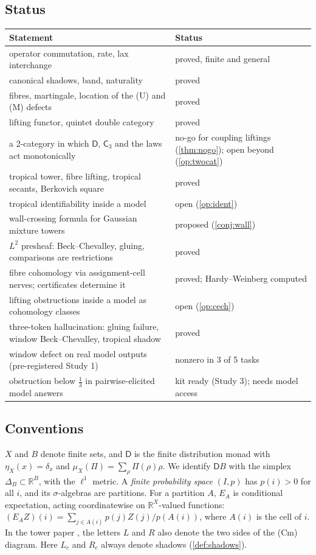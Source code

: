 \documentclass[11pt]{article}
\theoremstyle{definition}
\newcommand{\D}{\mathsf D}
\newcommand{\C}{\mathsf C}
\newcommand{\R}{\mathbb R}
\begin{document}
\subsection{Status}
\begin{center}\small
\begin{tabular}{>{\raggedright}p{9cm}>{\raggedright\arraybackslash}p{5.2cm}}\toprule
Statement & Status\\\midrule
operator commutation, rate, lax interchange & proved, finite and general\\
canonical shadows, band, naturality & proved\\
fibres, martingale, location of the (U) and (M) defects & proved\\
lifting functor, quintet double category & proved\\
a 2-category in which $\D$, $\C_3$ and the laws act monotonically & no-go for coupling liftings (\cref{thm:nogo}); open beyond (\cref{op:twocat})\\
tropical tower, fibre lifting, tropical secants, Berkovich square & proved\\
tropical identifiability inside a model & open (\cref{op:ident})\\
wall-crossing formula for Gaussian mixture towers & proposed (\cref{conj:wall})\\
$L^2$ presheaf: Beck--Chevalley, gluing, comparisons are restrictions & proved\\
fibre cohomology via assignment-cell nerves; certificates determine it & proved; Hardy--Weinberg computed\\
lifting obstructions inside a model as cohomology classes & open (\cref{op:cech})\\
three-token hallucination: gluing failure, window Beck--Chevalley, tropical shadow & proved\\
window defect on real model outputs (pre-registered Study 1) & nonzero in 3 of 5 tasks\\
obstruction below $\tfrac13$ in pairwise-elicited model answers & kit ready (Study 3); needs model access\\
\bottomrule
\end{tabular}
\end{center}

\subsection{Conventions}
$X$ and $B$ denote finite sets, and $\D$ is the finite distribution monad with $\eta_X(x)=\delta_x$ and $\mu_X(\Pi)=\sum_\rho\Pi(\rho)\rho$.
We identify $\D B$ with the simplex $\Delta_B\subset\R^B$, with the $\ell^1$ metric. A \emph{finite probability space} $(I,p)$ has
$p(i)>0$ for all $i$, and its $\sigma$-algebras are partitions. For a partition $A$, $E_A$ is conditional expectation, acting
coordinatewise on $\R^X$-valued functions: $(E_AZ)(i)=\sum_{j\in A(i)}p(j)Z(j)/p(A(i))$, where $A(i)$ is the cell of $i$. In the
tower paper \cite{Tower}, the letters $L$ and $R$ also denote the two sides of the (Cm) diagram. Here $L_c$ and $R_c$ always denote
shadows (\cref{def:shadows}).
\end{document}
